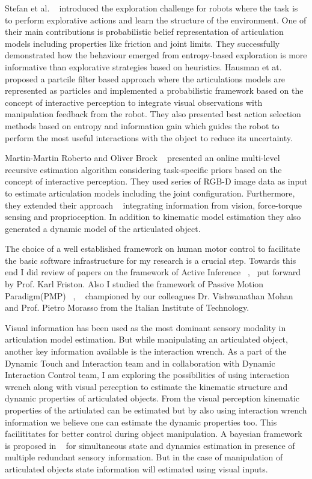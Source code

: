 \documentclass[12pt,a4paper]{report}
\begin{document}
Stefan et al. ~\cite{otte2014entropy} introduced the exploration challenge for robots where the task is to perform explorative actions and learn the structure of the environment. One of their main contributions is probabilistic belief representation of articulation models including properties like friction and joint limits. They successfully demonstrated how the behaviour emerged from entropy-based exploration is more informative than explorative strategies based on heuristics. Hausman et at. ~\cite{hausman2015active} proposed a partcile filter based approach where the articulations models are represented as particles and implemented a probabilistic framework based on the concept of interactive perception to integrate visual observations with manipulation feedback from the robot. They also presented best action selection methods based on entropy and information gain which guides the robot to perform the most useful interactions with the object to reduce its uncertainty.

Martin-Martin Roberto and Oliver Brock ~\cite{martin2014online} presented an online multi-level recursive estimation algorithm considering task-specific priors based on the concept of interactive perception. They used series of RGB-D image data as input to estimate articulation models including the joint configuration. Furthermore, they extended their approach ~\cite{martin2017building} integrating information from vision, force-torque sensing and proprioception. In addition to kinematic model estimation they also generated a dynamic model of the articulated object. 

The choice of a well established framework on human motor control to facilitate the basic software infrastructure for my research is a crucial step. Towards this end I did review of papers on the framework of Active Inference ~\cite{friston2015active},~\cite{friston2011action} put forward by Prof. Karl Friston. Also I studied the framework of Passive Motion Paradigm(PMP) ~\cite{mohan2011passive}, ~\cite{mohan2013inference} championed by our colleagues Dr. Vishwanathan Mohan and Prof. Pietro Morasso from the Italian Institute of Technology.

Visual information has been used as the most dominant sensory modality in articulation model estimation. But while manipulating an articulated object, another key information available is the interaction wrench. As a part of the Dynamic Touch and Interaction team and in collaboration with Dynamic Interaction Control  team, I am  exploring the possibilities of using interaction wrench along with visual perception  to estimate the kinematic structure and dynamic properties of articulated objects. From the visual perception kinematic properties of the artiulated can be estimated but by also using interaction wrench information we believe one can estimate the dynamic properties too. This facilititates for better control during object manipulation. A bayesian framework is proposed in ~\cite{nori2015simultaneous} for simultaneous state and dynamics estimation in presence of multiple redundant sensory information. But in the case of manipulation of articulated objects state information will estimated using visual inputs. 
 
\end{document}

